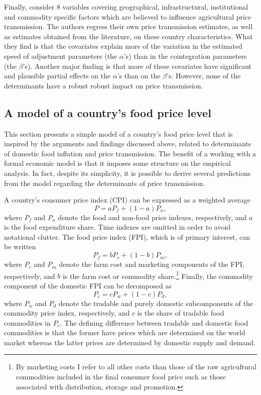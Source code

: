 \documentclass[12pt,english]{article}
\begin{document}
Finally, \citet{greb12} consider 8 variables covering geographical, infrastructural, institutional and commodity specific factors which are believed to influence agricultural price transmission. The authors regress their own price transmission estimates, as well as estimates obtained from the literature, on these country characteristics. What they find is that the covariates explain more of the variation in the estimated speed of adjustment parameters (the $\alpha$'s) than in the cointegration parameters (the $\beta$'s). Another major finding is that more of these covariates have significant and plausible partial effects on the $\alpha$'s than on the $\beta$'s. However, none of the determinants have a robust robust impact on price transmission.

\subsection{A model of a country's food price level}
This section presents a simple model of a country's food price level that is inspired by the arguments and findings discussed above, related to determinants of domestic food inflation and price transmission. The benefit of a working with a formal economic model is that it imposes some structure on the empirical analysis. In fact, despite its simplicity, it is possible to derive several predictions from the model regarding the determinants of price transmission.

A country's consumer price index (CPI) can be expressed as a weighted average
\begin{equation}
P =a P_{f}+(1-a)P_{n}\label{eq:cpi},
\end{equation}
where $P_{f}$ and $P_{n}$ denote the food and non-food price indexes, respectively, and $a$ is the food expenditure share. Time indexes are omitted in order to avoid notational clutter. The food price index (FPI), which is of primary interest, can be written
\begin{equation}
P_{f} =b P_{c}+(1-b)P_{m}\label{eq:fpi},
\end{equation}
where $P_{c}$ and $P_{m}$ denote the farm cost and marketing components of the FPI, respectively, and $b$ is the farm cost or commodity share.\footnote{By marketing costs I refer to all other costs than those of the raw agricultural commodities included in the final consumer food price such as those associated with distribution, storage and promotion.}  Finally, the commodity component of the domestic FPI can be decomposed as 
\begin{equation}
P_{c} =c P_{w}+(1-c)P_{d}\label{eq:compi},
\end{equation}
where $P_{w}$ and $P_{d}$ denote the tradable and purely domestic subcomponents of the commodity price index, respectively, and $c$ is the share of tradable food commodities in $P_{c}$. The defining difference between tradable and domestic food commodities is that the former have prices which are determined on the world market whereas the latter prices are determined by domestic supply and demand. 
\end{document}
